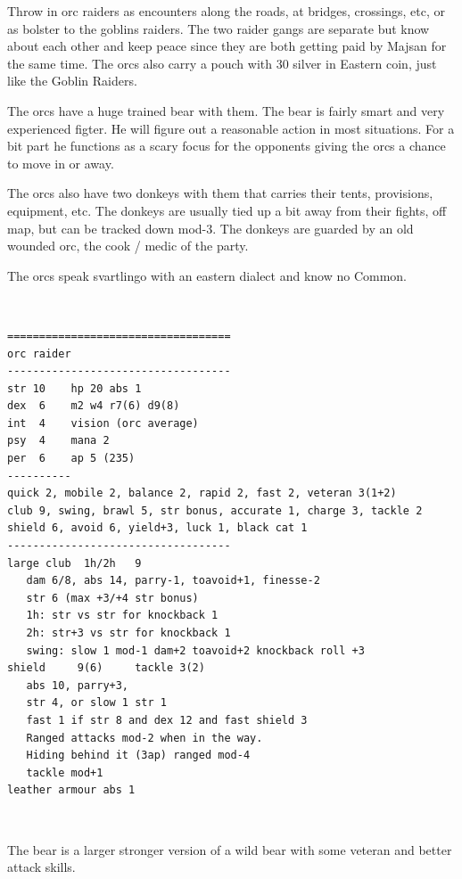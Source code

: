 Throw in orc raiders as encounters along the roads, at bridges, crossings, etc, or as bolster to the goblins raiders. The two raider gangs are separate but know about each other and keep peace since they are both getting paid by Majsan for the same time. The orcs also carry a pouch with 30 silver in Eastern coin, just like the Goblin Raiders.

The orcs have a huge trained bear with them. The bear is fairly smart and very experienced figter. He will figure out a reasonable action in most situations. For a bit part he functions as a scary focus for the opponents giving the orcs a chance to move in or away.

The orcs also have two donkeys with them that carries their tents, provisions, equipment, etc. The donkeys are usually tied up a bit away from their fights, off map, but can be tracked down mod-3. The donkeys are guarded by an old wounded orc, the cook / medic of the party.

The orcs speak svartlingo with an eastern dialect and know no Common.

\

\small \begin{verbatim}
===================================
orc raider
-----------------------------------
str 10    hp 20 abs 1
dex  6    m2 w4 r7(6) d9(8)
int  4    vision (orc average)
psy  4    mana 2
per  6    ap 5 (235)
----------
quick 2, mobile 2, balance 2, rapid 2, fast 2, veteran 3(1+2)
club 9, swing, brawl 5, str bonus, accurate 1, charge 3, tackle 2
shield 6, avoid 6, yield+3, luck 1, black cat 1
-----------------------------------
large club  1h/2h   9
   dam 6/8, abs 14, parry-1, toavoid+1, finesse-2
   str 6 (max +3/+4 str bonus)
   1h: str vs str for knockback 1
   2h: str+3 vs str for knockback 1
   swing: slow 1 mod-1 dam+2 toavoid+2 knockback roll +3
shield     9(6)     tackle 3(2)
   abs 10, parry+3,
   str 4, or slow 1 str 1
   fast 1 if str 8 and dex 12 and fast shield 3
   Ranged attacks mod-2 when in the way.
   Hiding behind it (3ap) ranged mod-4
   tackle mod+1
leather armour abs 1
\end{verbatim} \normalsize

\

The bear is a larger stronger version of a wild bear with some veteran and better attack skills.







